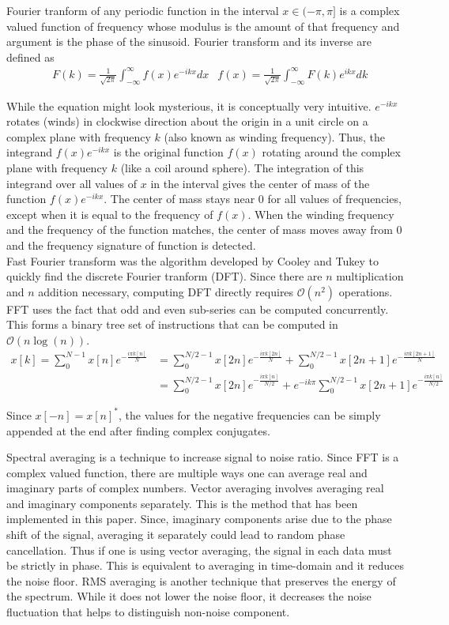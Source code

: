 \documentclass{article}
\begin{document}
Fourier tranform of any periodic function in the interval $x \in (-\pi, \pi]$ is a complex valued function of frequency whose modulus is the amount of that frequency and argument is the phase of the sinusoid. Fourier transform and its inverse are defined as
\begin{align*}
&F(k) = \frac{1}{\sqrt{2\pi}} \int_{-\infty}^{\infty} f(x)e^{-ikx} dx 
&f(x) = \frac{1}{\sqrt{2\pi}} \int_{-\infty}^{\infty} F(k)e^{ikx} dk
\end{align*}

While the equation might look mysterious, it is conceptually very intuitive. $e^{-ikx}$ rotates (winds) in clockwise direction about the origin in a unit circle on a complex plane with frequency $k$ (also known as winding frequency). Thus, the integrand $f(x)e^{-ikx}$ is the original function $f(x)$ rotating around the complex plane with frequency $k$ (like a coil around sphere). The integration of this integrand over all values of $x$ in the interval gives the center of mass of the function $f(x)e^{-ikx}$. The center of mass stays near $0$ for all values of frequencies, except when it is equal to the frequency of $f(x)$. When the winding frequency and the frequency of the function matches, the center of mass moves away from $0$ and the frequency signature of  function is detected. \\

Fast Fourier transform was the algorithm developed by Cooley and Tukey to quickly find the discrete Fourier tranform (DFT). Since there are $n$ multiplication and $n$ addition necessary, computing DFT directly requires $\mathcal{O}(n^2)$ operations. FFT uses the fact that odd and even sub-series can be computed concurrently. This forms a binary tree set of instructions that can be computed in $\mathcal{O}(n\log(n))$.
\begin{align*}
x[k] = \sum_{0}^{N-1} x[n] e^{-\frac{i\pi k[n]}{N}}  &=  \sum_{0}^{N/2-1} x[2n] e^{-\frac{i\pi k[2n]}{N}} + \sum_{0}^{N/2-1} x[2n+1] e^{-\frac{i\pi k[2n+1]}{N}} \\
&= \sum_{0}^{N/2-1} x[2n] e^{-\frac{i\pi k[n]}{N/2}} + e^{-ik \pi}\sum_{0}^{N/2-1} x[2n+1] e^{-\frac{i\pi k[n]}{N/2}}
\end{align*}

Since $x[-n] = x[n]^{*}$, the values for the negative frequencies can be simply appended at the end after finding complex conjugates. 

Spectral averaging is a technique to increase signal to noise ratio. Since FFT is a complex valued function, there are multiple ways one can average real and imaginary parts of complex numbers. Vector averaging involves averaging real and imaginary components separately. This is the method that has been implemented in this paper. Since, imaginary components arise due to the phase shift of the signal, averaging it separately could lead to random phase cancellation. Thus if one is using vector averaging, the signal in each data must be strictly in phase. This is equivalent to averaging in time-domain and it reduces the noise floor.
RMS averaging is another technique that preserves the energy of the spectrum. While it does not lower the noise floor, it decreases the noise fluctuation that helps to distinguish non-noise component.
\end{document}
